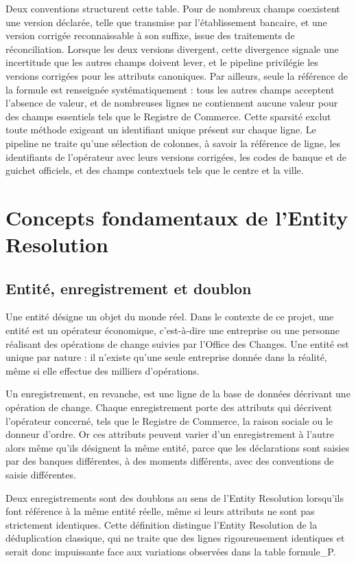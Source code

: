 \noindent Deux conventions structurent cette table. Pour de nombreux champs coexistent une version déclarée, telle que transmise par l'établissement bancaire, et une version corrigée reconnaissable à son suffixe, issue des traitements de réconciliation. Lorsque les deux versions divergent, cette divergence signale une incertitude que les autres champs doivent lever, et le pipeline privilégie les versions corrigées pour les attributs canoniques. Par ailleurs, seule la référence de la formule est renseignée systématiquement : tous les autres champs acceptent l'absence de valeur, et de nombreuses lignes ne contiennent aucune valeur pour des champs essentiels tels que le Registre de Commerce. Cette sparsité exclut toute méthode exigeant un identifiant unique présent sur chaque ligne. Le pipeline ne traite qu'une sélection de colonnes, à savoir la référence de ligne, les identifiants de l'opérateur avec leurs versions corrigées, les codes de banque et de guichet officiels, et des champs contextuels tels que le centre et la ville.

\section{Concepts fondamentaux de l'Entity Resolution}

\subsection{Entité, enregistrement et doublon}

Une entité désigne un objet du monde réel. Dans le contexte de ce projet, une entité est un opérateur économique, c'est-à-dire une entreprise ou une personne réalisant des opérations de change suivies par l'Office des Changes. Une entité est unique par nature : il n'existe qu'une seule entreprise donnée dans la réalité, même si elle effectue des milliers d'opérations.

Un enregistrement, en revanche, est une ligne de la base de données décrivant une opération de change. Chaque enregistrement porte des attributs qui décrivent l'opérateur concerné, tels que le Registre de Commerce, la raison sociale ou le donneur d'ordre. Or ces attributs peuvent varier d'un enregistrement à l'autre alors même qu'ils désignent la même entité, parce que les déclarations sont saisies par des banques différentes, à des moments différents, avec des conventions de saisie différentes.

Deux enregistrements sont des doublons au sens de l'Entity Resolution lorsqu'ils font référence à la même entité réelle, même si leurs attributs ne sont pas strictement identiques. Cette définition distingue l'Entity Resolution de la déduplication classique, qui ne traite que des lignes rigoureusement identiques et serait donc impuissante face aux variations observées dans la table formule\_P.

